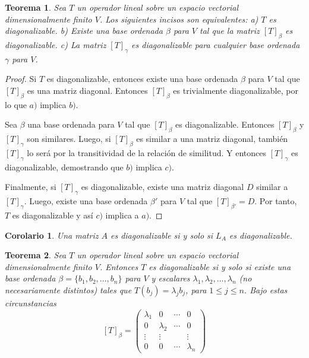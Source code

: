 \documentclass{book}
\newtheorem{theorem}{Teorema}
\newtheorem{corollary}{Corolario}
\begin{document}
\begin{theorem}
Sea $T$ un operador lineal sobre un espacio vectorial dimensionalmente finito $V$. Los siguientes incisos son equivalentes:
 \newline \newline
a) $T$ es diagonalizable. \newline
b) Existe una base ordenada $\beta$ para $V$ tal que la matriz $[T]_{\beta}$ es diagonalizable. \newline
c) La matriz $[T]_{\gamma}$ es diagonalizable para cualquier base ordenada $\gamma$ para $V$.
\end{theorem}

\begin{proof}
Si $T$ es diagonalizable, entonces existe una base ordenada $\beta$ para $V$ tal que $[T]_{\beta}$ es una matriz diagonal. Entonces $[T]_{\beta}$ es trivialmente diagonalizable, por lo que $a)$ implica $b)$. 

Sea $\beta$ una base ordenada para $V$ tal que $[T]_{\beta}$ es diagonalizable. Entonces $[T]_{\beta}$ y $[T]_{\gamma}$ son similares. Luego, si $[T]_{\beta}$ es similar a una matriz diagonal, también $[T]_{\gamma}$ lo será por la transitividad de la relación de similitud. Y entonces $[T]_{\gamma}$ es diagonalizable, demostrando que $b)$ implica $c)$.

Finalmente, si $[T]_{\gamma}$ es diagonalizable, existe una matriz diagonal $D$ similar a $[T]_{\gamma}$. Luego, existe una base ordenada $\beta '$ para $V$ tal que  $[T]_{\beta '}=D$. Por tanto, $T$ es diagonalizable y así $c)$ implica a $a)$.
\end{proof}

\begin{corollary}
Una matriz $A$ es diagonalizable si y solo si $L_{A}$ es diagonalizable.
\end{corollary}

\begin{theorem}
Sea $T$ un operador lineal sobre un espacio vectorial dimensionalmente finito $V$. Entonces $T$ es diagonalizable si y solo si existe una base ordenada $\beta =\{b_1,b_2,...,b_n\}$ para $V$ y escalares $\lambda_1, \lambda_2, ..., \lambda_n$ (no necesariamente distintos) tales que $T(b_j)=\lambda_j b_j$, para $1\leq j \leq n$. Bajo estas circunstancias 
\[
[T]_{\beta}=
\begin{pmatrix}
\lambda_1 & 0 & \cdots & 0\\
0 & \lambda_2 & \cdots & 0\\
\vdots & \vdots &   & \vdots\\
0 & 0 & \cdots & \lambda_{n}
\end{pmatrix}
\]
\end{theorem}
\end{document}
